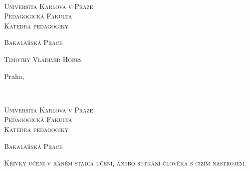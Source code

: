 \documentclass[a4paper,12pt,czech,cleardoublepage=empty]{scrreprt}
\newcommand{\SubjectCs}{Bakalařská Prace}
\newcommand{\TitleCs}{Křívky učení v raném stadia učení, anebo setkání člověka s cizím nastrojem.}
\newcommand{\AuthorName}{Timothy Vladimir Hobbs}
\newcommand{\IssuedIn}{Praha}
\newcommand{\DepartmentCs}{Katedra pedagogiky}
\newcommand{\noun}[1]{\textsc{#1}}
\begin{document}
~\thispagestyle{empty}\vfill{}

\begin{center}
\vspace{10mm}
\textsf{\textsc{\noun{\LARGE Universita Karlova v Praze}}}\\
\vspace{0.5em}
\textsf{\textsc{\noun{\LARGE Pedagogická Fakulta}}}\\
\vspace*{1em}
\textsf{\textsc{\noun{\Large \DepartmentCs}}}\vspace{15mm}
\vspace{30mm}

\textsf{\textsc{\noun{\huge \SubjectCs}}}{\huge \par}

\vspace{15mm}


\vspace{10mm}

\textsf{\textsc{\noun{\Large \AuthorName}}}

\end{center}

\vspace*{\fill}


\vspace{10mm}

\textsf{\large \IssuedIn, \the\year}


\clearpage{}~\thispagestyle{empty}\begin{center}\vspace{10mm}


\textsf{\textsc{\noun{\LARGE Universita Karlova v Praze}}}\\
\vspace{0.5em}
\textsf{\textsc{\noun{\LARGE Pedagogická Fakulta}}}\\
\vspace*{1em}
\textsf{\textsc{\noun{\Large \DepartmentCs}}}\vspace{15mm}


\vspace{15mm}

\textsf{\textsc{\noun{\huge \SubjectCs}}}{\huge \par}

\vspace{15mm}


\textsf{\textsc{\noun{\LARGE \TitleCs}}}{\LARGE \par}


\vspace{10mm}


\end{center} 
\end{document}
